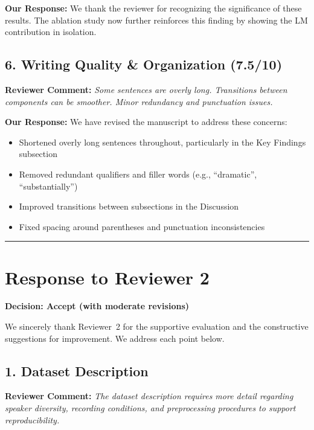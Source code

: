 \documentclass[11pt]{article}
\newcommand{\reviewercomment}[1]{\textcolor{reviewercolor}{\textbf{Reviewer Comment:} \textit{#1}}}
\newcommand{\response}[1]{\textcolor{responsecolor}{\textbf{Our Response:} #1}}
\begin{document}
\response{We thank the reviewer for recognizing the significance of these results. The ablation study now further reinforces this finding by showing the LM contribution in isolation.}

\vspace{1em}

\subsection*{6. Writing Quality \& Organization (7.5/10)}

\reviewercomment{Some sentences are overly long. Transitions between components can be smoother. Minor redundancy and punctuation issues.}

\response{We have revised the manuscript to address these concerns:}
\begin{itemize}[noitemsep]
    \item Shortened overly long sentences throughout, particularly in the Key Findings subsection
    \item Removed redundant qualifiers and filler words (e.g., ``dramatic'', ``substantially'')
    \item Improved transitions between subsections in the Discussion
    \item Fixed spacing around parentheses and punctuation inconsistencies
\end{itemize}

\vspace{1.5em}
\hrule
\vspace{1em}

\section*{Response to Reviewer 2}
\textbf{Decision: Accept (with moderate revisions)}

\vspace{0.5em}

We sincerely thank Reviewer~2 for the supportive evaluation and the constructive suggestions for improvement. We address each point below.

\vspace{1em}

\subsection*{1. Dataset Description}

\reviewercomment{The dataset description requires more detail regarding speaker diversity, recording conditions, and preprocessing procedures to support reproducibility.}
\end{document}
